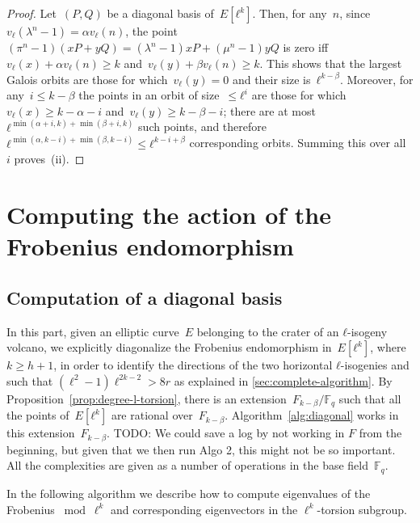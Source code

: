 \documentclass{lms}
\newcommand{\todo}[1]{{\color{red}TODO: #1}}
\newcommand{\F}{\mathbb{F}}
\begin{document}
\begin{proof}
Let~$(P, Q)$ be a diagonal basis of~$E[ℓ^k]$.
Then, for any~$n$, since $v_{ℓ} (λ^n - 1) = α v_{ℓ}(n)$,
the point $(π^n - 1) (x P + y Q) = (λ^n-1) x P + (μ^n-1) y Q$
is zero iff $v_{ℓ} (x) + α v_{ℓ} (n) ≥ k$ and~$v_{ℓ} (y) + β v_{ℓ} (n) ≥ k$.
This shows that the largest Galois orbits
are those for which~$v_{ℓ} (y) = 0$ and their size is~$ℓ^{k - β}$.
Moreover, for any~$i ≤ k-β$ the points in an orbit of size~$≤ ℓ^i$
are those for which~$v_{ℓ} (x) ≥ k - α - i$ and~$v_{ℓ} (y) ≥ k - β - i$;
there are at most $ℓ^{\min(α+i, k) + \min (β+i, k)}$ such points,
and therefore $ℓ^{\min(α, k-i) + \min(β, k-i)} ≤ ℓ^{k-i+β}$
corresponding orbits.
Summing this over all~$i$ proves~(ii).
\end{proof}
\section{Computing the action of the Frobenius endomorphism}
\label{sec:acti-frob-endm}
\subsection{Computation of a diagonal basis}
\label{ss:diagonal}

In this part, given an elliptic curve~$E$ belonging to the crater of
an $ℓ$-isogeny volcano, we explicitly diagonalize the Frobenius
endomorphism in~$E[ℓ^k]$, where $k ≥ h+1$, in order to identify the
directions of the two horizontal $ℓ$-isogenies and such that $(\ell^2-1)\ell^{2k-2}>8r$ as explained in \ref{sec:complete-algorithm}.  By
Proposition~\ref{prop:degree-l-torsion}, there is an
extension~$F_{k-\beta}/\F_q$ %
such that all the points
of~$E[ℓ^k]$ are rational over~$F_{k-\beta}$.  Algorithm~\ref{alg:diagonal} works
in this extension~$F_{k-\beta}$. \todo{We could save a log by not working in $F$
  from the beginning, but given that we then run Algo 2, this might
  not be so important.}  All the complexities are given as a number of
operations in the base field~$\mathbb F_q$.

In the following algorithm we describe how to compute eigenvalues of
the Frobenius $\bmod \ell^k$ and
corresponding eigenvectors in the $\ell^{k}$-torsion subgroup.
\end{document}
